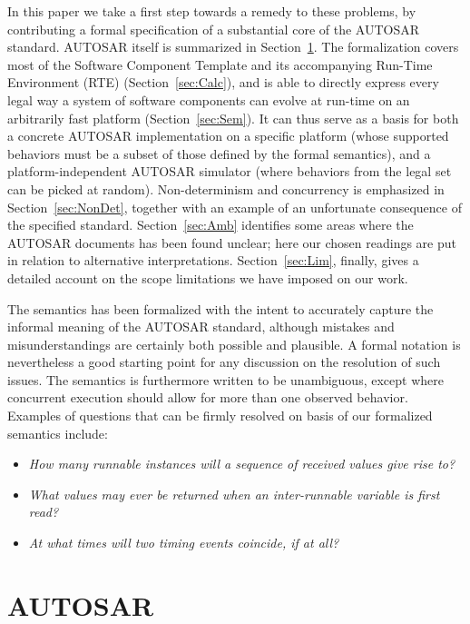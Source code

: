 \documentclass[10pt,conference]{IEEEtran}
\begin{document}
In this paper we take a first step towards a remedy to these problems, by contributing a formal specification of a substantial core of the AUTOSAR standard. AUTOSAR itself is summarized in Section~\ref{sec:autosar}. The formalization covers most of the Software Component Template and its accompanying Run-Time Environment (RTE) (Section~\ref{sec:Calc}), and is able to directly express every legal way a system of software components can evolve at run-time on an arbitrarily fast platform (Section~\ref{sec:Sem}). It can thus serve as a basis for both a concrete AUTOSAR implementation on a specific platform (whose supported behaviors must be a subset of those defined by the formal semantics), and a platform-independent AUTOSAR simulator (where behaviors from the legal set can be picked at random). 
Non-determinism and concurrency is emphasized in Section~\ref{sec:NonDet}, together with an example of an unfortunate consequence of the specified standard. Section~\ref{sec:Amb} identifies some areas where the AUTOSAR documents has been found unclear; here our chosen readings are put in relation to alternative interpretations. Section~\ref{sec:Lim}, finally, gives a detailed account on the scope limitations we have imposed on our work.

The semantics has been formalized with the intent to accurately capture the informal meaning of the AUTOSAR standard, although mistakes and misunderstandings are certainly both possible and plausible. A formal notation is nevertheless a good starting point for any discussion on the resolution of such issues. The semantics is furthermore written to be unambiguous, except where concurrent execution should allow for more than one observed behavior. Examples of questions that can be firmly resolved on basis of our formalized semantics include:
\begin{itemize}
\item {\em How many runnable instances will a sequence of received values give rise to?}
\item {\em What values may ever be returned when an inter-runnable variable is first read?}
\item {\em At what times will two timing events coincide, if at all?}
\end{itemize}


\section{AUTOSAR}
\label{sec:autosar}
\end{document}
